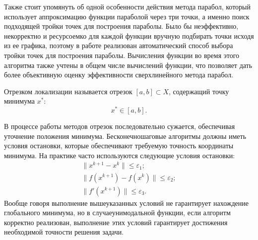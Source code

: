 Также стоит упомянуть об одной особенности действия метода парабол, который использует аппроксимацию
функции параболой через три точки, а именно поиск подходящей тройки точек для построения параболы.
Было бы неэффективно, некорректно и ресурсоемко для каждой функции вручную подбирать точки
исходя из ее графика, поэтому в работе реализован автоматический способ выбора тройки точек для
построения параболы. Вычисления функции во время этого алгоритма также учтены в общем числе вычислений
функции, что позволяет дать более объективную оценку эффективности сверхлинейного метода парабол.

\begin{definition}
Отрезком локализации называется отрезок
\([a,b] \subset X\), содержащий точку минимума \(x^*\):
\[
x^* \in [a,b].
\]
\end{definition}

В процессе работы методов отрезок последовательно сужается, обеспечивая уточнение
положения минимума. Бесконечношаговые алгоритмы должны иметь условия остановки,
которые обеспечивают требуемую точность координаты минимума. 
На практике часто используются следующие условия остановки:
\begin{gather}
    \|x^{k+1} - x^k\| \leq \varepsilon_1; \\
    \|f(x^{k+1}) - f(x^k)\| \leq \varepsilon_2; \\
    \|f'(x^{k+1})\| \leq \varepsilon_3.
\end{gather}
Вообще говоря выполнение вышеуказанных условий не гарантирует нахождение
глобального минимума, но в случаеунимодальной функции, 
если алгоритм корректно реализован, выполнение этих условий
гарантирует достижения необходимой точности решения задачи.
